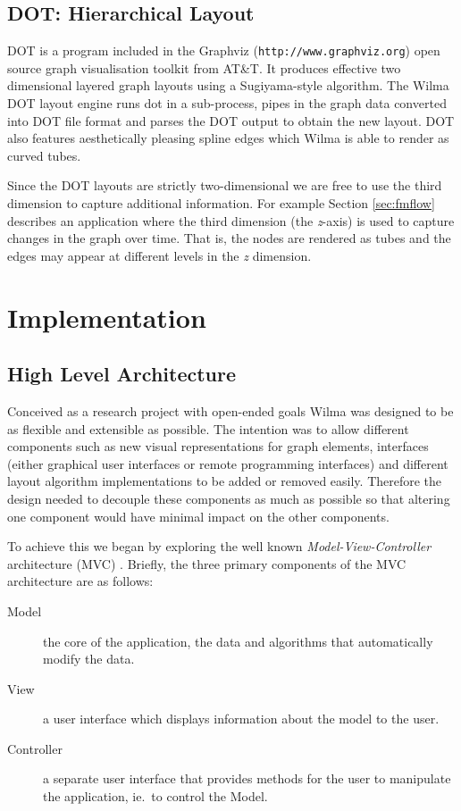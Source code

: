 \documentclass[runningheads]{cl2emult}
\newcommand{\url}[1]{{\small{\tt #1}}}
\begin{document}
\subsection{DOT: Hierarchical Layout} \label{sec:dot}
DOT is a program included in the Graphviz
(\url{http://www.graphviz.org}) open source graph visualisation
toolkit from AT\&T.  It produces effective two dimensional layered graph
layouts using a Sugiyama\cite{Sugiyama81methods}-style algorithm.
The Wilma DOT layout engine runs dot in a sub-process, pipes in the graph
data converted into DOT file format and parses the DOT output to
obtain the new layout.
DOT also features aesthetically pleasing spline edges which Wilma
is able to render as curved tubes.

Since the DOT layouts are strictly two-dimensional we are free to use the
third dimension to capture additional information.  For example
Section \ref{sec:fmflow} describes an application where the third
dimension (the {\em z}-axis) is used to capture changes in the graph over time.
That is, the nodes are rendered as tubes and the edges may appear at different
levels in the {\em z} dimension.

\section{Implementation}\label{sec:implementation}
\subsection{High Level Architecture}
Conceived as a research project with open-ended goals Wilma was
designed to be as flexible and extensible as possible.  The intention
was to allow different components such as new visual representations
for graph elements, interfaces (either graphical user interfaces or
remote programming interfaces) and different 
layout algorithm implementations to be added or removed easily.
Therefore the design needed to decouple these components as much as
possible so that altering one component would have minimal impact on
the other components.

To achieve this we began by exploring the well known {\em
Model-View-Controller} architecture (MVC) \cite{gamma94design}.
Briefly, the three primary components of the MVC architecture are as
follows: 

\begin{description}
\item[Model] the core
of the application, the data and algorithms that automatically modify
the data. 
\item[View] a user interface which displays information
about the model to the user. 
\item[Controller] a separate user
interface that provides methods for the user to manipulate the
application, ie.\ to control the Model.  
\end{description}
\end{document}
